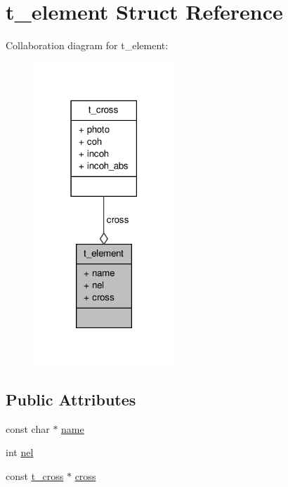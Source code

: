 \hypertarget{structt__element}{\section{t\-\_\-element \-Struct \-Reference}
\label{structt__element}
}


\-Collaboration diagram for t\-\_\-element\-:
\nopagebreak
\begin{figure}[H]
\begin{center}
\leavevmode
\includegraphics[width=150pt]{structt__element__coll__graph}
\end{center}
\end{figure}
\subsection*{\-Public \-Attributes}
\begin{DoxyCompactItemize}
\item 
const char $\ast$ \hyperlink{structt__element_a3050bf4f2f2049b4280d161c55f58431}{name}
\item 
int \hyperlink{structt__element_a01855ba2eb47607f9e9a3162b89eb5b3}{nel}
\item 
const \hyperlink{structt__cross}{t\-\_\-cross} $\ast$ \hyperlink{structt__element_a4aa9fd44dddf5988c65e2fba1eea27fe}{cross}
\end{DoxyCompactItemize}


